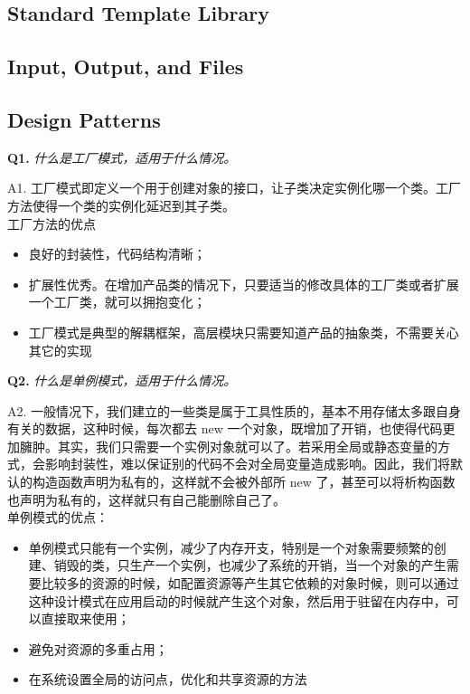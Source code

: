 \documentclass[cn,10pt,math=newtx,citestyle=gb7714-2015,bibstyle=gb7714-2015]{elegantbook}
\begin{document}
\subsection{Standard Template Library}

\subsection{Input, Output, and Files}

\subsection{Design Patterns}

\textbf{Q1.} \textit{什么是工厂模式，适用于什么情况。}

A1. 工厂模式即定义一个用于创建对象的接口，让子类决定实例化哪一个类。工厂方法使得一个类的实例化延迟到其子类。\\

工厂方法的优点
\begin{itemize}
  \item 良好的封装性，代码结构清晰；
  \item 扩展性优秀。在增加产品类的情况下，只要适当的修改具体的工厂类或者扩展一个工厂类，就可以拥抱变化；
  \item 工厂模式是典型的解耦框架，高层模块只需要知道产品的抽象类，不需要关心其它的实现\\
\end{itemize}


\textbf{Q2.} \textit{什么是单例模式，适用于什么情况。}

A2. 一般情况下，我们建立的一些类是属于工具性质的，基本不用存储太多跟自身有关的数据，这种时候，每次都去 new 一个对象，既增加了开销，也使得代码更加臃肿。其实，我们只需要一个实例对象就可以了。若采用全局或静态变量的方式，会影响封装性，难以保证别的代码不会对全局变量造成影响。因此，我们将默认的构造函数声明为私有的，这样就不会被外部所 new 了，甚至可以将析构函数也声明为私有的，这样就只有自己能删除自己了。\\


单例模式的优点：
\begin{itemize}
  \item 单例模式只能有一个实例，减少了内存开支，特别是一个对象需要频繁的创建、销毁的类，只生产一个实例，也减少了系统的开销，当一个对象的产生需要比较多的资源的时候，如配置资源等产生其它依赖的对象时候，则可以通过这种设计模式在应用启动的时候就产生这个对象，然后用于驻留在内存中，可以直接取来使用；
  \item 避免对资源的多重占用；
  \item 在系统设置全局的访问点，优化和共享资源的方法\\
\end{itemize}
\end{document}
